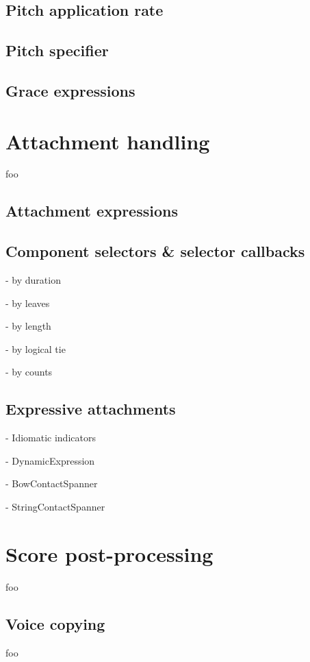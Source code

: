 \subsection{Pitch application rate}

\subsection{Pitch specifier}

\subsection{Grace expressions}

\section{Attachment handling}

foo

\subsection{Attachment expressions}

\subsection{Component selectors \& selector callbacks}

- by duration

- by leaves

- by length

- by logical tie

- by counts

\subsection{Expressive attachments}

- Idiomatic indicators

- DynamicExpression

- BowContactSpanner

- StringContactSpanner

\section{Score post-processing}

foo

\subsection{Voice copying}

foo